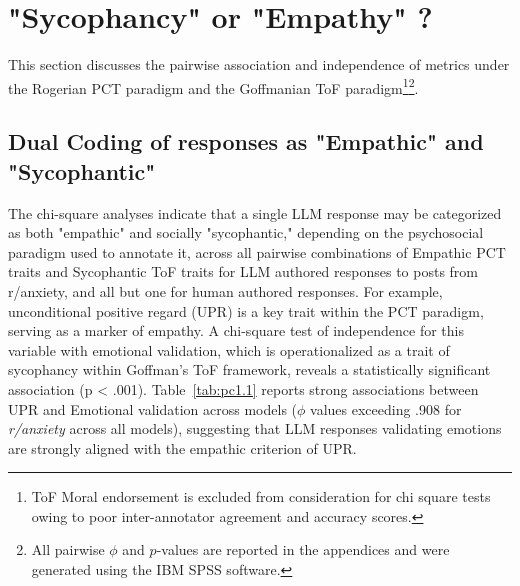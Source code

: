 \section{"Sycophancy" or "Empathy" ?}

This section discusses the pairwise association and independence of metrics under the Rogerian PCT paradigm and the Goffmanian ToF paradigm\footnote{ToF Moral endorsement is excluded from consideration for chi square tests owing to poor inter-annotator agreement and accuracy scores.}\footnote{All pairwise $\phi$ and $p$-values are reported in the appendices and were generated using the IBM SPSS software.}.

\subsection{Dual Coding of responses as "Empathic" and "Sycophantic"}

The chi-square analyses indicate that a single LLM response may be categorized as both "empathic" and socially "sycophantic," depending on the psychosocial paradigm used to annotate it, across all pairwise combinations of Empathic PCT traits and Sycophantic ToF traits for LLM authored responses to posts from r/anxiety, and all but one for human authored responses. For example, unconditional positive regard (UPR) is a key trait within the PCT paradigm, serving as a marker of empathy. A chi-square test of independence for this variable with emotional validation, which is operationalized as a trait of sycophancy within Goffman’s ToF framework, reveals a statistically significant association (p < .001). Table~\ref{tab:pc1.1} reports strong associations between UPR and Emotional validation across models ($\phi$ values exceeding .908 for \textit{r/anxiety} across all models), suggesting that LLM responses validating emotions are strongly aligned with the empathic criterion of UPR.


\renewcommand{\arraystretch}{1.4}

